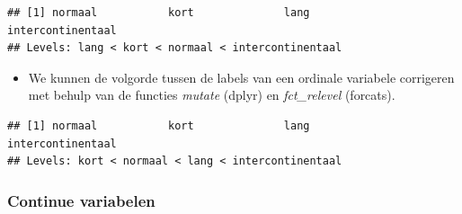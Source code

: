 \documentclass[]{tufte-book}
\providecommand{\tightlist}{%
  \setlength{\itemsep}{0pt}\setlength{\parskip}{0pt}}
\begin{document}
\begin{verbatim}
## [1] normaal           kort              lang              intercontinentaal
## Levels: lang < kort < normaal < intercontinentaal
\end{verbatim}

\begin{itemize}
\tightlist
\item
  We kunnen de volgorde tussen de labels van een ordinale variabele corrigeren met behulp van de functies \emph{mutate} (dplyr) en \emph{fct\_relevel} (forcats).
\end{itemize}

\begin{verbatim}
## [1] normaal           kort              lang              intercontinentaal
## Levels: kort < normaal < lang < intercontinentaal
\end{verbatim}

\hypertarget{continue-variabelen}{%
\subsubsection{Continue variabelen}\label{continue-variabelen}}
\end{document}

